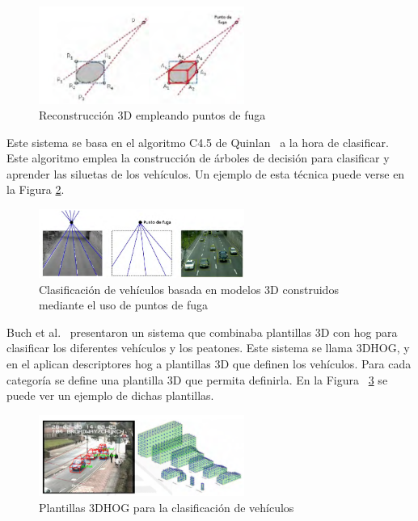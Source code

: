\begin{figure}[H]
  \begin{center}
    \includegraphics[width=0.6\textwidth]{figures/Estado_arte/3d_puntos_fuga.png}
		\caption{Reconstrucción 3D empleando puntos de fuga}
		\label{fig.3d_fuga}
		\end{center}
\end{figure}

Este sistema se basa en el algoritmo C4.5 de Quinlan~\cite{c4_5} a la hora de clasificar. Este algoritmo emplea la construcción de árboles de decisión para clasificar y aprender las siluetas de los vehículos. Un ejemplo de esta técnica puede verse en la Figura \ref{fig.c4_5}.

\begin{figure}[H]
  \begin{center}
    \includegraphics[width=0.6\textwidth]{figures/Estado_arte/c4_5.png}
		\caption{Clasificación de vehículos basada en modelos 3D construidos mediante el uso de puntos de fuga}
		\label{fig.c4_5}
		\end{center}
\end{figure}

Buch et al.~\cite{3dhog_article} presentaron un sistema que combinaba plantillas 3D con \acrshort{hog} para clasificar los diferentes vehículos y los peatones. Este sistema se llama 3DHOG, y en el aplican descriptores \acrshort{hog} a plantillas 3D que definen los vehículos. Para cada categoría se define una plantilla 3D que permita definirla. En la Figura ~\ref{fig.3dhog} se puede ver un ejemplo de dichas plantillas.

\begin{figure}[H]
  \begin{center}
    \includegraphics[width=0.6\textwidth]{figures/Estado_arte/3dhog.png}
		\caption{Plantillas 3DHOG para la clasificación de vehículos}
		\label{fig.3dhog}
		\end{center}
\end{figure}

